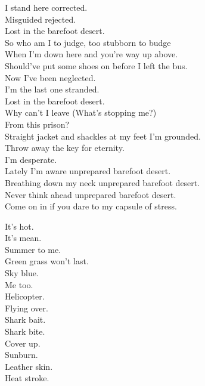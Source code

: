 I stand here corrected. \\
Misguided rejected. \\
Lost in the barefoot desert. \\

So who am I to judge, too stubborn to budge \\
When I'm down here and you're way up above. \\
Should've put some shoes on before I left the bus. \\

Now I've been neglected. \\
I'm the last one stranded. \\
Lost in the barefoot desert. \\
Why can't I leave (What's stopping me?) \\
From this prison? \\
Straight jacket and shackles at my feet I'm grounded. \\
Throw away the key for eternity. \\
I'm desperate. \\

Lately I'm aware unprepared barefoot desert. \\
Breathing down my neck unprepared barefoot desert. \\
Never think ahead unprepared barefoot desert. \\
Come on in if you dare to my capsule of stress. \\




It's hot. \\
It's mean. \\
Summer to me. \\
Green grass won't last. \\
Sky blue. \\
Me too. \\
Helicopter. \\
Flying over. \\
Shark bait. \\
Shark bite. \\
Cover up. \\
Sunburn. \\
Leather skin. \\
Heat stroke. \\

